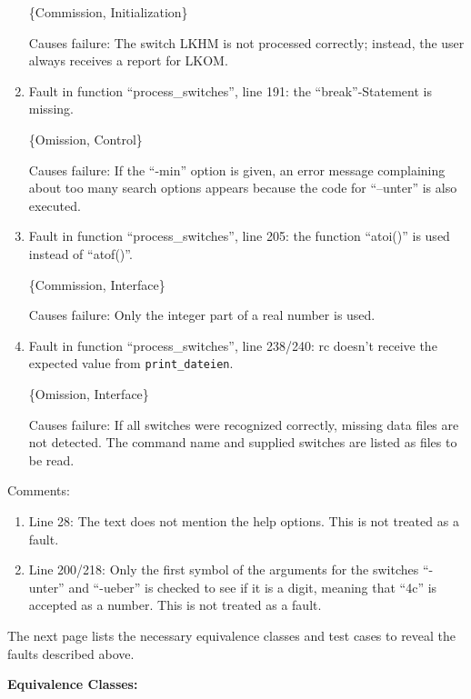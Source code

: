 \begin{enumerate}
\{Commission, Initialization\}

Causes failure: The switch LKHM is not processed correctly; instead,
the user always receives a report for LKOM.

\item Fault in function ``process\_switches'', line 191: the
``break''-Statement is missing.

\{Omission, Control\}

Causes failure: If the ``-min'' option is given, an error message
complaining about too many search options appears because the code for
``--unter'' is also executed.

\item Fault in function ``process\_switches'', line 205: the function 
``atoi()'' is used instead of ``atof()''.

\{Commission, Interface\}

Causes failure: Only the integer part of a real number is used.


\item Fault in function ``process\_switches'', line 238/240: rc doesn't
receive the expected value from {\tt print\_dateien}.

\{Omission, Interface\}

Causes failure: If all switches were recognized correctly, missing
data files are not detected.  The command name and supplied switches
are listed as files to be read.

\end{enumerate}

Comments:

\begin{enumerate}
\item Line 28: The text does not mention the help options.
This is not treated as a fault.

\item Line 200/218: Only the first symbol of the arguments for the
switches ``-unter'' and ``-ueber'' is checked to see if it is a digit,
meaning that ``4c'' is accepted as a number.  This is not treated as a
fault. 

\end{enumerate}


The next page lists the necessary equivalence classes and test cases
to reveal the faults described above.

\newpage

\textbf{Equivalence Classes:}
\smallskip

